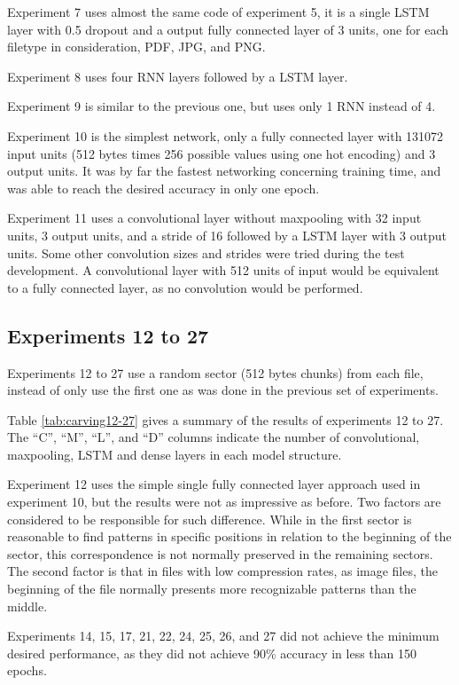 Experiment 7 uses almost the same code of experiment 5, it is a single LSTM layer with 0.5 dropout and a output fully connected layer of 3 units, one for each filetype in consideration, PDF, JPG, and PNG.

Experiment 8 uses four RNN layers followed by a LSTM layer.

Experiment 9 is similar to the previous one, but uses only 1 RNN instead of 4.

Experiment 10 is the simplest network, only a fully connected layer with 131072 input units (512 bytes times 256 possible values using one hot encoding) and 3 output units. It was by far the fastest networking concerning training time, and was able to reach the desired accuracy in only one epoch.

Experiment 11 uses a convolutional layer without maxpooling with 32 input units, 3 output units, and a stride of 16 followed by a LSTM layer with 3 output units. Some other convolution sizes and strides were tried during the test development. A convolutional layer with 512 units of input would be equivalent to a fully connected layer, as no convolution would be performed.

\subsection{Experiments 12 to 27}

Experiments 12 to 27 use a random sector (512 bytes chunks) from each file, instead of only use the first one as was done in the previous set of experiments.

Table \ref{tab:carving12-27} gives a summary of the results of experiments 12 to 27. The ``C'', ``M'', ``L'', and ``D'' columns indicate the number of convolutional, maxpooling, LSTM and dense layers in each model structure.


Experiment 12 uses the simple single fully connected layer approach used in experiment 10, but the results were not as impressive as before. Two factors are considered to be responsible for such difference. While in the first sector is reasonable to find patterns in specific positions in relation to the beginning of the sector, this correspondence is not normally preserved in the remaining sectors. The second factor is that in files with low compression rates, as image files, the beginning of the file normally presents more recognizable patterns than the middle.

Experiments 14, 15, 17, 21, 22, 24, 25, 26, and 27 did not achieve the minimum desired performance, as they did not achieve 90\% accuracy in less than 150 epochs.


